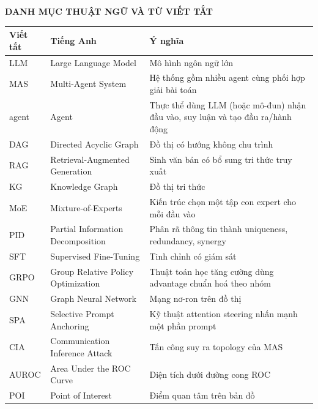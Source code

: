 \documentclass[a4paper,13pt,twoside]{report}
\begin{document}
\thispagestyle{fancy}
\begin{center}
\Large\textbf{DANH MỤC THUẬT NGỮ VÀ TỪ VIẾT TẮT}
\end{center}
\vspace{0.3cm}
\renewcommand{\arraystretch}{1.3}
\begin{center}
\begin{tabular}{p{2.0cm} >{\raggedright\arraybackslash}p{4.4cm} >{\raggedright\arraybackslash}p{7.0cm}}
\toprule
\textbf{Viết tắt} & \textbf{Tiếng Anh} & \textbf{Ý nghĩa} \\
\midrule
LLM   & Large Language Model           & Mô hình ngôn ngữ lớn \\
MAS   & Multi-Agent System             & Hệ thống gồm nhiều agent cùng phối hợp giải bài toán \\
agent & Agent                          & Thực thể dùng LLM (hoặc mô-đun) nhận đầu vào, suy luận và tạo đầu ra/hành động \\
DAG   & Directed Acyclic Graph         & Đồ thị có hướng không chu trình \\
RAG   & Retrieval-Augmented Generation & Sinh văn bản có bổ sung tri thức truy xuất \\
KG    & Knowledge Graph                & Đồ thị tri thức \\
MoE   & Mixture-of-Experts             & Kiến trúc chọn một tập con expert cho mỗi đầu vào \\
PID   & Partial Information Decomposition & Phân rã thông tin thành uniqueness, redundancy, synergy \\
SFT   & Supervised Fine-Tuning         & Tinh chỉnh có giám sát \\
GRPO  & Group Relative Policy Optimization & Thuật toán học tăng cường dùng advantage chuẩn hoá theo nhóm \\
GNN   & Graph Neural Network           & Mạng nơ-ron trên đồ thị \\
SPA   & Selective Prompt Anchoring     & Kỹ thuật attention steering nhấn mạnh một phần prompt \\
CIA   & Communication Inference Attack & Tấn công suy ra topology của MAS \\
AUROC & Area Under the ROC Curve       & Diện tích dưới đường cong ROC \\
POI   & Point of Interest              & Điểm quan tâm trên bản đồ \\
\bottomrule
\end{tabular}
\end{center}
\renewcommand{\arraystretch}{1}
\newpage












\end{document}
